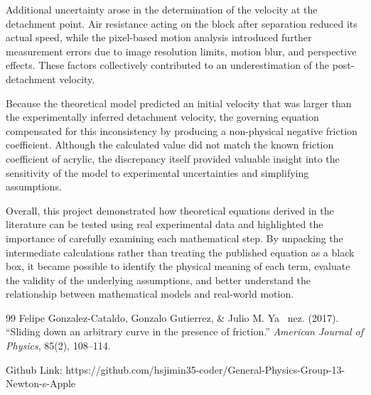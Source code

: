 \documentclass[11pt,letterpaper]{article}
\begin{document}
Additional uncertainty arose in the determination of the velocity at the detachment point. Air resistance acting on the block after separation reduced its actual speed, while the pixel-based motion analysis introduced further measurement errors due to image resolution limits, motion blur, and perspective effects. These factors collectively contributed to an underestimation of the post-detachment velocity.

Because the theoretical model predicted an initial velocity that was larger than the experimentally inferred detachment velocity, the governing equation compensated for this inconsistency by producing a non-physical negative friction coefficient. Although the calculated value did not match the known friction coefficient of acrylic, the discrepancy itself provided valuable insight into the sensitivity of the model to experimental uncertainties and simplifying assumptions.

Overall, this project demonstrated how theoretical equations derived in the literature can be tested using real experimental data and highlighted the importance of carefully examining each mathematical step. By unpacking the intermediate calculations rather than treating the published equation as a black box, it became possible to identify the physical meaning of each term, evaluate the validity of the underlying assumptions, and better understand the relationship between mathematical models and real-world motion.

\begin{thebibliography}{99}
Felipe Gonzalez-Cataldo, Gonzalo Gutierrez, \& Julio M. Ya~ nez. (2017).
``Sliding down an arbitrary curve in the presence of friction.''
\textit{American Journal of Physics}, 85(2), 108--114.

\end{thebibliography}

Github Link: https://github.com/hsjimin35-coder/General-Physics-Group-13-Newton-s-Apple
\end{document}
